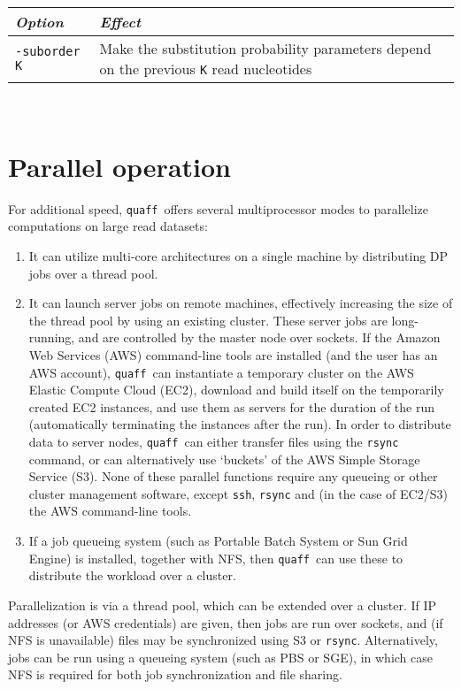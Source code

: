 \documentclass{article}
\newcommand\quaff{{\tt quaff}}
\newcommand\opt[1]{{\tt -#1}}
\newcommand\opttable[1]{\begin{tabular}[l]{ll} \hline {\em Option} & {\em Effect} \\ #1 \hline \end{tabular} \\}
\newcommand\optdesc[2]{\hline \opt{#1} & \parbox{.8\linewidth}{#2} \\ }
\begin{document}
\opttable{
  \optdesc{suborder K}{Make the substitution probability parameters depend on the previous {\tt K} read nucleotides}
  \optdesc{gaporder K}{Make the indel probability parameters depend on the previous {\tt K} read nucleotides}
  \optdesc{order K}{A shorthand for {\tt -suborder K -gaporder K}}
  }


\section{Parallel operation}


For additional speed, \quaff\ offers several multiprocessor modes to parallelize computations on large read datasets:
\begin{enumerate}
\item It can utilize multi-core architectures on a single machine by distributing DP jobs over a thread pool.
\item It can launch server jobs on remote machines, effectively increasing the size of the thread pool by using an existing cluster. These server jobs are long-running, and are controlled by the master node over sockets. If the Amazon Web Services (AWS) command-line tools are installed (and the user has an AWS account), \quaff\ can instantiate a temporary cluster on the AWS Elastic Compute Cloud (EC2), download and build itself on the temporarily created EC2 instances, and use them as servers for the duration of the run (automatically terminating the instances after the run). In order to distribute data to server nodes, \quaff\ can either transfer files using the {\tt rsync} command, or can alternatively use `buckets' of the AWS Simple Storage Service (S3). None of these parallel functions require any queueing or other cluster management software, except {\tt ssh}, {\tt rsync} and (in the case of EC2/S3) the AWS command-line tools.
\item If a job queueing system (such as Portable Batch System or Sun Grid Engine) is installed, together with NFS, then \quaff\ can use these to distribute the workload over a cluster.
\end{enumerate}

Parallelization is via a thread pool, which can be extended over a cluster.
If IP addresses (or AWS credentials) are given, then jobs are run over sockets,
and (if NFS is unavailable) files may be synchronized using S3 or {\tt rsync}.
Alternatively, jobs can be run using a queueing system (such as PBS or SGE),
in which case NFS is required for both job synchronization and file sharing.
\end{document}
